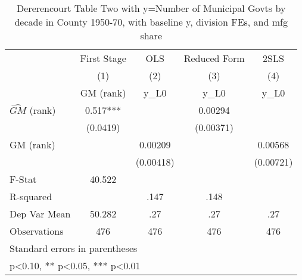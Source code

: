 \begin{table}[htbp]\centering
\def\sym#1{\ifmmode^{#1}\else\(^{#1}\)\fi}
\caption{Dererencourt Table Two with y=Number of Municipal Govts by decade in County 1950-70, with baseline y, division FEs, and mfg share}
\begin{tabular}{l*{4}{c}}
\toprule
                    & First Stage   &         OLS   &Reduced Form   &        2SLS   \\
                    &\multicolumn{1}{c}{(1)}&\multicolumn{1}{c}{(2)}&\multicolumn{1}{c}{(3)}&\multicolumn{1}{c}{(4)}\\
                    &\multicolumn{1}{c}{GM  (rank)}&\multicolumn{1}{c}{y\_L0}&\multicolumn{1}{c}{y\_L0}&\multicolumn{1}{c}{y\_L0}\\
\midrule
$\hat{GM}$ (rank)   &       0.517***&               &     0.00294   &               \\
                    &    (0.0419)   &               &   (0.00371)   &               \\
\addlinespace
GM  (rank)          &               &     0.00209   &               &     0.00568   \\
                    &               &   (0.00418)   &               &   (0.00721)   \\
\midrule
F-Stat              &      40.522   &               &               &               \\
R-squared           &               &        .147   &        .148   &               \\
Dep Var Mean        &      50.282   &         .27   &         .27   &         .27   \\
Observations        &         476   &         476   &         476   &         476   \\
\bottomrule
\multicolumn{5}{l}{\footnotesize Standard errors in parentheses}\\
\multicolumn{5}{l}{\footnotesize * p<0.10, ** p<0.05, *** p<0.01}\\
\end{tabular}
\end{table}

